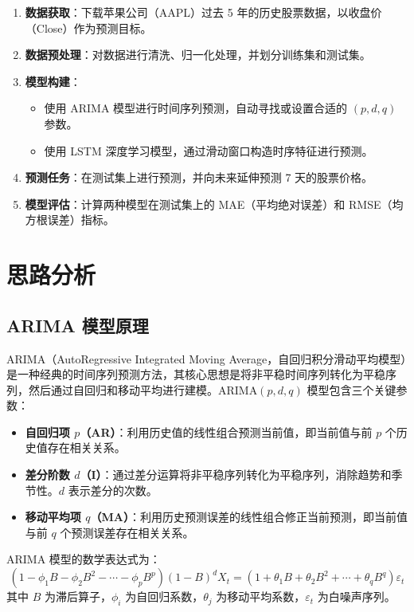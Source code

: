 \documentclass[a4paper]{article}
\begin{document}
\begin{enumerate}
    \item \textbf{数据获取}：下载苹果公司（AAPL）过去 5 年的历史股票数据，以收盘价（Close）作为预测目标。
    \item \textbf{数据预处理}：对数据进行清洗、归一化处理，并划分训练集和测试集。
    \item \textbf{模型构建}：
    \begin{itemize}
        \item 使用 ARIMA 模型进行时间序列预测，自动寻找或设置合适的 $(p, d, q)$ 参数。
        \item 使用 LSTM 深度学习模型，通过滑动窗口构造时序特征进行预测。
    \end{itemize}
    \item \textbf{预测任务}：在测试集上进行预测，并向未来延伸预测 7 天的股票价格。
    \item \textbf{模型评估}：计算两种模型在测试集上的 MAE（平均绝对误差）和 RMSE（均方根误差）指标。
\end{enumerate}

\section{思路分析}

\subsection{ARIMA 模型原理}

ARIMA（AutoRegressive Integrated Moving Average，自回归积分滑动平均模型）是一种经典的时间序列预测方法，其核心思想是将非平稳时间序列转化为平稳序列，然后通过自回归和移动平均进行建模。ARIMA$(p, d, q)$ 模型包含三个关键参数：

\begin{itemize}
    \item \textbf{自回归项 $p$（AR）}：利用历史值的线性组合预测当前值，即当前值与前 $p$ 个历史值存在相关关系。
    \item \textbf{差分阶数 $d$（I）}：通过差分运算将非平稳序列转化为平稳序列，消除趋势和季节性。$d$ 表示差分的次数。
    \item \textbf{移动平均项 $q$（MA）}：利用历史预测误差的线性组合修正当前预测，即当前值与前 $q$ 个预测误差存在相关关系。
\end{itemize}

ARIMA 模型的数学表达式为：
\[
(1 - \phi_1 B - \phi_2 B^2 - \cdots - \phi_p B^p)(1-B)^d X_t = (1 + \theta_1 B + \theta_2 B^2 + \cdots + \theta_q B^q)\varepsilon_t
\]
其中 $B$ 为滞后算子，$\phi_i$ 为自回归系数，$\theta_j$ 为移动平均系数，$\varepsilon_t$ 为白噪声序列。
\end{document}
